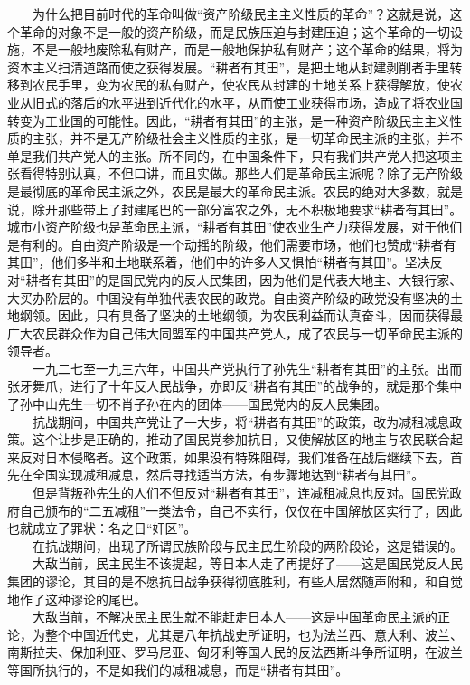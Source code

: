 \documentclass[cn,11pt,chinese]{elegantbook}
\begin{document}
　　为什么把目前时代的革命叫做“资产阶级民主主义性质的革命”？这就是说，这个革命的对象不是一般的资产阶级，而是民族压迫与封建压迫；这个革命的一切设施，不是一般地废除私有财产，而是一般地保护私有财产；这个革命的结果，将为资本主义扫清道路而使之获得发展。“耕者有其田”，是把土地从封建剥削者手里转移到农民手里，变为农民的私有财产，使农民从封建的土地关系上获得解放，使农业从旧式的落后的水平进到近代化的水平，从而使工业获得市场，造成了将农业国转变为工业国的可能性。因此，“耕者有其田”的主张，是一种资产阶级民主主义性质的主张，并不是无产阶级社会主义性质的主张，是一切革命民主派的主张，并不单是我们共产党人的主张。所不同的，在中国条件下，只有我们共产党人把这项主张看得特别认真，不但口讲，而且实做。那些人们是革命民主派呢？除了无产阶级是最彻底的革命民主派之外，农民是最大的革命民主派。农民的绝对大多数，就是说，除开那些带上了封建尾巴的一部分富农之外，无不积极地要求“耕者有其田”。城市小资产阶级也是革命民主派，“耕者有其田”使农业生产力获得发展，对于他们是有利的。自由资产阶级是一个动摇的阶级，他们需要市场，他们也赞成“耕者有其田”，他们多半和土地联系着，他们中的许多人又惧怕“耕者有其田”。坚决反对“耕者有其田”的是国民党内的反人民集团，因为他们是代表大地主、大银行家、大买办阶层的。中国没有单独代表农民的政党。自由资产阶级的政党没有坚决的土地纲领。因此，只有具备了坚决的土地纲领，为农民利益而认真奋斗，因而获得最广大农民群众作为自己伟大同盟军的中国共产党人，成了农民与一切革命民主派的领导者。\\
　　一九二七至一九三六年，中国共产党执行了孙先生“耕者有其田”的主张。出而张牙舞爪，进行了十年反人民战争，亦即反“耕者有其田”的战争的，就是那个集中了孙中山先生一切不肖子孙在内的团体——国民党内的反人民集团。\\
　　抗战期间，中国共产党让了一大步，将“耕者有其田”的政策，改为减租减息政策。这个让步是正确的，推动了国民党参加抗日，又使解放区的地主与农民联合起来反对日本侵略者。这个政策，如果没有特殊阻碍，我们准备在战后继续下去，首先在全国实现减租减息，然后寻找适当方法，有步骤地达到“耕者有其田”。\\
　　但是背叛孙先生的人们不但反对“耕者有其田”，连减租减息也反对。国民党政府自己颁布的“二五减租”一类法令，自己不实行，仅仅在中国解放区实行了，因此也就成立了罪状：名之日“奸区”。\\
　　在抗战期间，出现了所谓民族阶段与民主民生阶段的两阶段论，这是错误的。\\
　　大敌当前，民主民生不该提起，等日本人走了再提好了——这是国民党反人民集团的谬论，其目的是不愿抗日战争获得彻底胜利，有些人居然随声附和，和自觉地作了这种谬论的尾巴。\\
　　大敌当前，不解决民主民生就不能赶走日本人——这是中国革命民主派的正论，为整个中国近代史，尤其是八年抗战史所证明，也为法兰西、意大利、波兰、南斯拉夫、保加利亚、罗马尼亚、匈牙利等国人民的反法西斯斗争所证明，在波兰等国所执行的，不是如我们的减租减息，而是“耕者有其田”。\\
\end{document}
